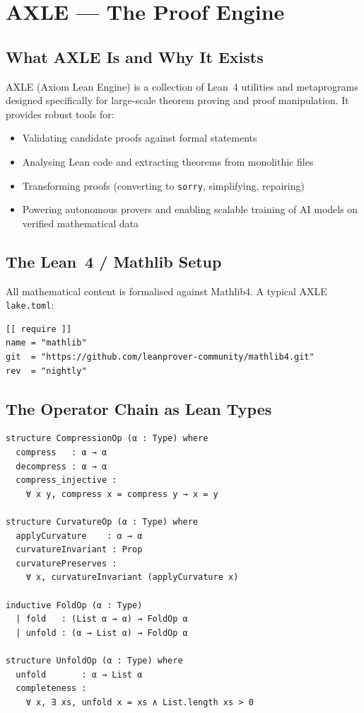 \documentclass[11pt, twoside, openright]{book}
\theoremstyle{plain}
\theoremstyle{definition}
\begin{document}
\chapter{AXLE --- The Proof Engine}

\section{What AXLE Is and Why It Exists}

AXLE (Axiom Lean Engine) is a collection of Lean~4 utilities and
metaprograms designed specifically for large-scale theorem proving and
proof manipulation. It provides robust tools for:
\begin{itemize}[leftmargin=*]
  \item Validating candidate proofs against formal statements
  \item Analysing Lean code and extracting theorems from monolithic files
  \item Transforming proofs (converting to \texttt{sorry}, simplifying, repairing)
  \item Powering autonomous provers and enabling scalable training of AI
    models on verified mathematical data
\end{itemize}

\section{The Lean~4 / Mathlib Setup}

All mathematical content is formalised against Mathlib4.
A typical AXLE \texttt{lake.toml}:

\begin{verbatim}
[[ require ]]
name = "mathlib"
git  = "https://github.com/leanprover-community/mathlib4.git"
rev  = "nightly"
\end{verbatim}

\section{The Operator Chain as Lean Types}

\begin{verbatim}
structure CompressionOp (α : Type) where
  compress   : α → α
  decompress : α → α
  compress_injective :
    ∀ x y, compress x = compress y → x = y

structure CurvatureOp (α : Type) where
  applyCurvature    : α → α
  curvatureInvariant : Prop
  curvaturePreserves :
    ∀ x, curvatureInvariant (applyCurvature x)

inductive FoldOp (α : Type)
  | fold   : (List α → α) → FoldOp α
  | unfold : (α → List α) → FoldOp α

structure UnfoldOp (α : Type) where
  unfold       : α → List α
  completeness :
    ∀ x, ∃ xs, unfold x = xs ∧ List.length xs > 0
\end{verbatim}
\end{document}
